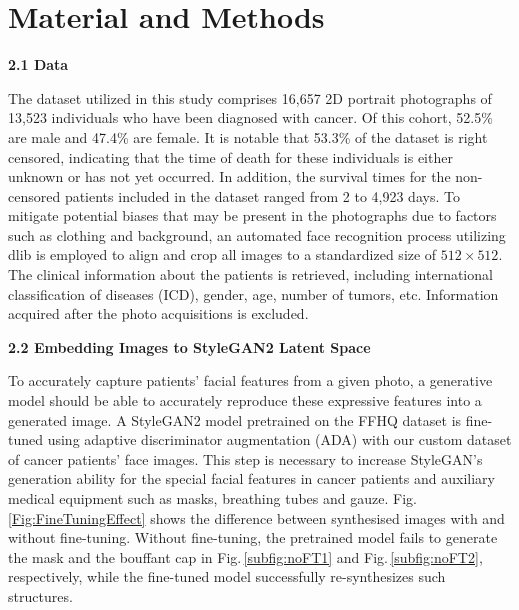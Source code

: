 \documentclass[runningheads]{llncs}
\begin{document}
\section{Material and Methods}
\textbf{2.1 Data}
\vspace{5pt}

The dataset utilized in this study comprises 16,657 2D portrait photographs of 13,523 individuals who have been diagnosed with cancer. Of this cohort, 52.5\% are male and 47.4\% are female. It is notable that 53.3\% of the dataset is right censored, indicating that the time of death for these individuals is either unknown or has not yet occurred. In addition, the survival times for the non-censored patients included in the dataset ranged from 2 to 4,923 days. To mitigate potential biases that may be present in the photographs due to factors such as clothing and background, an automated face recognition process utilizing dlib \cite{dlib09} is employed to align and crop all images to a standardized size of $512 \times 512$. The clinical information about the patients is retrieved, including international classification of diseases (ICD), gender, age, number of tumors, etc. Information acquired after the photo acquisitions is excluded.

\vspace{5pt}
\noindent\textbf{2.2 Embedding Images to StyleGAN2 Latent Space}
\vspace{5pt}

To accurately capture patients' facial features from a given photo, a generative model should be able to accurately reproduce these expressive features into a generated image.
A StyleGAN2 model pretrained on the FFHQ dataset \cite{karras2019style} is fine-tuned using adaptive discriminator augmentation (ADA) \cite{karras2020training} with our custom dataset of cancer patients' face images. This step is necessary to increase StyleGAN's generation ability for the special facial features in cancer patients and auxiliary medical equipment such as masks, breathing tubes and gauze. 
Fig.\,\ref{Fig:FineTuningEffect} shows the difference between synthesised images with and without fine-tuning. Without fine-tuning, the pretrained model fails to generate the mask and the bouffant cap in Fig.\,\ref{subfig:noFT1}  and Fig.\,\ref{subfig:noFT2}, respectively, while the fine-tuned model successfully re-synthesizes such structures.
\end{document}
